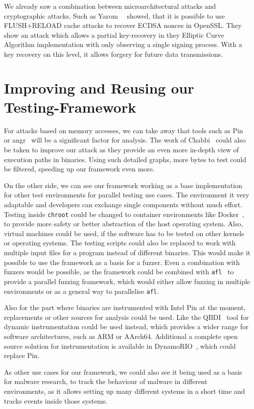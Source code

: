 We already saw a combination between microarchitectural attacks and
cryptographic attacks. Such as Yarom~\etal~\cite{noncerec} showed, that it is
possible to use FLUSH+RELOAD cache attacks to recover ECDSA nonces in OpenSSL.
They show an attack which allows a partial key-recovery in they Elliptic Curve
Algorithm implementation with only observing a single signing process. With a
key recovery on this level, it allows forgery for future data transmissions.

\section{Improving and Reusing our Testing-Framework}

For attacks based on memory accesses, we can take away that tools such as
Pin~\cite{pintool} or angr~\cite{angrpaper} will be a significant factor for
analysis. The work of Chabbi~\etal\cite{pincallpaths} could also be taken to
improve our attack as they provide an even more in-depth view of execution paths
in binaries. Using such detailed graphs, more bytes to test could be filtered,
speeding up our framework even more.

On the other side, we can see our framework working as a base implementation for
other test environments for parallel testing use cases. The environment it very
adaptable and developers can exchange single components without much effort.
Testing inside \texttt{chroot} could be changed to container environments like
Docker~\cite{docker}, to provide more safety or better abstraction of the host
operating system. Also, virtual machines could be used, if the software has to
be tested on other kernels or operating systems. The testing scripts could also
be replaced to work with multiple input files for a program instead of different
binaries. This would make it possible to use the framework as a basis for a
fuzzer. Even a combination with fuzzers would be possible, as the framework
could be combined with \texttt{afl}~\cite{aflweb} to provide a parallel fuzzing
framework, which would either allow fuzzing in multiple environments or as a
general way to parallelise \texttt{afl}.

Also for the part where binaries are instrumented with Intel Pin at the moment,
replacements or other sources for analysis could be used. Like the
QBDI~\cite{qbdi} tool for dynamic instrumentation could be used instead, which
provides a wider range for software architectures, such as ARM or AArch64.
Additional a complete open source solution for instrumentation is available in
DynamoRIO~\cite{dynrio}, which could replace Pin.

As other use cases for our framework, we could also see it being used as a basis
for malware research, to track the behaviour of malware in different
environments, as it allows setting up many different systems in a short time and
tracks events inside those systems.

